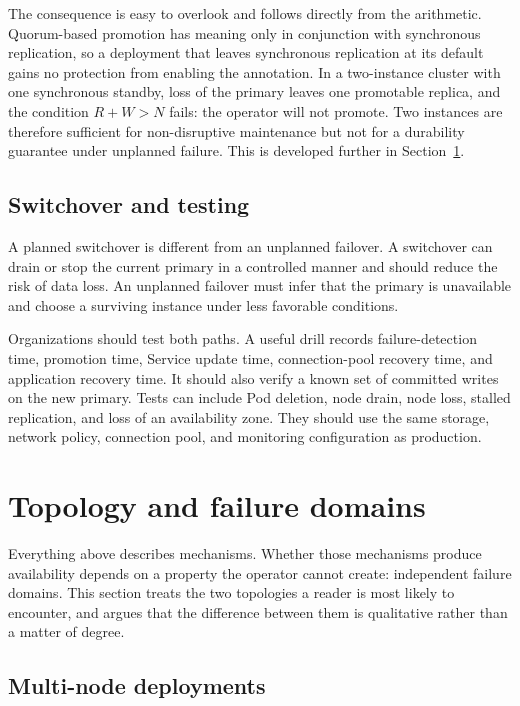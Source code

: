 \documentclass[11pt,a4paper]{article}
\begin{document}
The consequence is easy to overlook and follows directly from the arithmetic. Quorum-based promotion has meaning only in conjunction with synchronous replication, so a deployment that leaves synchronous replication at its default gains no protection from enabling the annotation. In a two-instance cluster with one synchronous standby, loss of the primary leaves one promotable replica, and the condition $R + W > N$ fails: the operator will not promote. Two instances are therefore sufficient for non-disruptive maintenance but not for a durability guarantee under unplanned failure. This is developed further in Section~\ref{sec:topology}.

\subsection{Switchover and testing}

A planned switchover is different from an unplanned failover. A switchover can drain or stop the current primary in a controlled manner and should reduce the risk of data loss. An unplanned failover must infer that the primary is unavailable and choose a surviving instance under less favorable conditions.

Organizations should test both paths. A useful drill records failure-detection time, promotion time, Service update time, connection-pool recovery time, and application recovery time. It should also verify a known set of committed writes on the new primary. Tests can include Pod deletion, node drain, node loss, stalled replication, and loss of an availability zone. They should use the same storage, network policy, connection pool, and monitoring configuration as production.

\section{Topology and failure domains}
\label{sec:topology}

Everything above describes mechanisms. Whether those mechanisms produce availability depends on a property the operator cannot create: independent failure domains. This section treats the two topologies a reader is most likely to encounter, and argues that the difference between them is qualitative rather than a matter of degree.

\subsection{Multi-node deployments}
\end{document}
